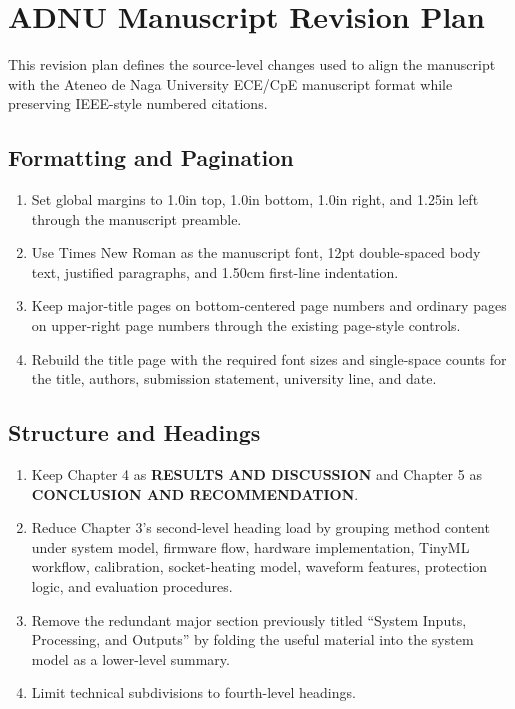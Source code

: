 \section*{ADNU Manuscript Revision Plan}

This revision plan defines the source-level changes used to align the
manuscript with the Ateneo de Naga University ECE/CpE manuscript format while
preserving IEEE-style numbered citations.

\subsection*{Formatting and Pagination}
\begin{enumerate}
  \item Set global margins to 1.0in top, 1.0in bottom, 1.0in right, and
  1.25in left through the manuscript preamble.
  \item Use Times New Roman as the manuscript font, 12pt double-spaced body
  text, justified paragraphs, and 1.50cm first-line indentation.
  \item Keep major-title pages on bottom-centered page numbers and ordinary
  pages on upper-right page numbers through the existing page-style controls.
  \item Rebuild the title page with the required font sizes and single-space
  counts for the title, authors, submission statement, university line, and
  date.
\end{enumerate}

\subsection*{Structure and Headings}
\begin{enumerate}
  \item Keep Chapter 4 as \textbf{RESULTS AND DISCUSSION} and Chapter 5 as
  \textbf{CONCLUSION AND RECOMMENDATION}.
  \item Reduce Chapter 3's second-level heading load by grouping method content
  under system model, firmware flow, hardware implementation, TinyML workflow,
  calibration, socket-heating model, waveform features, protection logic, and
  evaluation procedures.
  \item Remove the redundant major section previously titled ``System Inputs,
  Processing, and Outputs'' by folding the useful material into the system
  model as a lower-level summary.
  \item Limit technical subdivisions to fourth-level headings.
\end{enumerate}

